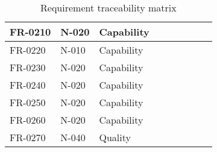 \begin{sidewaystable}
\begin{table}[H]
\begin{tabular}{|p{2cm}|p{2cm}|p{3cm}|p{2cm}|p{2cm}|p{2cm}|p{2cm}|p{2cm}|p{2cm}|}
 FR-0210 & N-020 & Capability & & & & & &\\ \hline
 FR-0220 & N-010 & Capability & & & & & &\\ \hline
 FR-0230 & N-020 & Capability & & & & & &\\ \hline
 FR-0240 & N-020 & Capability & & & & & &\\ \hline
 FR-0250 & N-020 & Capability & & & & & &\\ \hline
 FR-0260 & N-020 & Capability & & & & & &\\ \hline
 FR-0270 & N-040 & Quality    & & & & & &\\ \hline
\end{tabular}	
\caption{Requirement traceability matrix}
\end{table}






\end{sidewaystable}